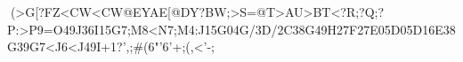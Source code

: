 (>G[?FZ<CW<CW@EYAE[@DY?BW;>S=@T>AU>BT<?R;?Q;?P:>P9=O49J36I15G7;M8<N7;M4:J15G04G/3D/2C38G49H27F27E05D05D16E38G39G7<J6<J49I+1?',;#(6"'6'+;(,<'-;%